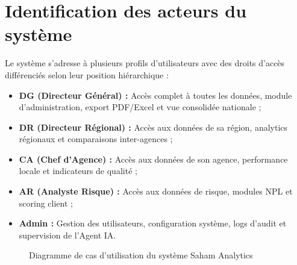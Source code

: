 \documentclass[a4paper,12pt]{report}
\begin{document}
\section{Identification des acteurs du système}
\begin{doublespace}
Le système s'adresse à plusieurs profils d'utilisateurs avec des droits d'accès différenciés selon leur position hiérarchique :
\begin{itemize}
    \item \textbf{DG (Directeur Général) :} Accès complet à toutes les données, module d'administration, export PDF/Excel et vue consolidée nationale ;
    \item \textbf{DR (Directeur Régional) :} Accès aux données de sa région, analytics régionaux et comparaisons inter-agences ;
    \item \textbf{CA (Chef d'Agence) :} Accès aux données de son agence, performance locale et indicateurs de qualité ;
    \item \textbf{AR (Analyste Risque) :} Accès aux données de risque, modules NPL et scoring client ;
    \item \textbf{Admin :} Gestion des utilisateurs, configuration système, logs d'audit et supervision de l'Agent IA.
\end{itemize}

\begin{figure}[H]
\centering
{}
\caption{Diagramme de cas d'utilisation du système Saham Analytics}
\label{fig:use_case_diagram}
\end{figure}
\end{doublespace}
\end{document}
